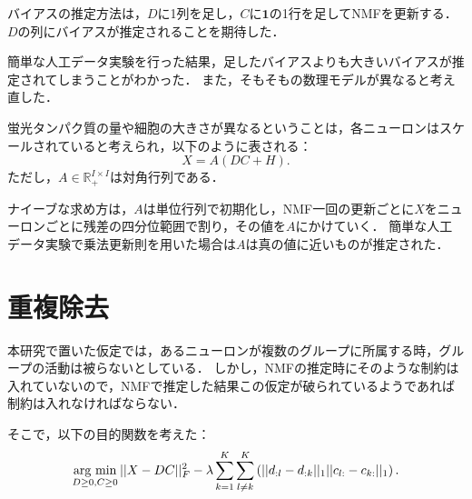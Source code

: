 バイアスの推定方法は，$D$に1列を足し，$C$に$\mathbf 1$の1行を足してNMFを更新する．
$D$の列にバイアスが推定されることを期待した．

簡単な人工データ実験を行った結果，足したバイアスよりも大きいバイアスが推定されてしまうことがわかった．
また，そもそもの数理モデルが異なると考え直した．

蛍光タンパク質の量や細胞の大きさが異なるということは，各ニューロンはスケールされていると考えられ，以下のように表される：
\begin{equation}
	X = A(DC + H).
\end{equation}
ただし，$A \in \mathbb{R}_+^{I \times I}$は対角行列である．

ナイーブな求め方は，$A$は単位行列で初期化し，NMF一回の更新ごとに$X$をニューロンごとに残差の四分位範囲で割り，その値を$A$にかけていく．
簡単な人工データ実験で乗法更新則を用いた場合は$A$は真の値に近いものが推定された．

\section{重複除去}
本研究で置いた仮定では，あるニューロンが複数のグループに所属する時，グループの活動は被らないとしている．
しかし，NMFの推定時にそのような制約は入れていないので，NMFで推定した結果この仮定が破られているようであれば制約は入れなければならない．

そこで，以下の目的関数を考えた：
\begin{align}
	\mathop{\textrm{arg~min}}\limits_{D \geq 0, C \geq 0} ||X - DC||_F^2 - \lambda \sum_{k=1}^K \sum_{l \neq k}^K \left( || d_{:l} - d_{:k} ||_1 || c_{l:} - c_{k:} ||_1 \right).
  \label{eq:overlap}
\end{align}

